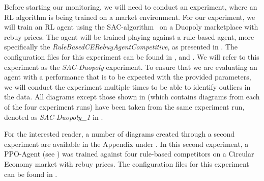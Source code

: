 Before starting our monitoring, we will need to conduct an experiment, where an RL algorithm is being trained on a market environment. For our experiment, we will train an RL agent using the SAC-algorithm~\cite{StableBaselines3SAC} on a Duopoly marketplace with rebuy prices. The agent will be trained playing against a rule-based agent, more specifically the \emph{RuleBasedCERebuyAgentCompetitive}, as presented in . The configuration files for this experiment can be found in ,  and . We will refer to this experiment as the \emph{SAC-Duopoly} experiment. To ensure that we are evaluating an agent with a performance that is to be expected with the provided parameters, we will conduct the experiment multiple times to be able to identify outliers in the data. All diagrams except those shown in  (which contains diagrams from each of the four experiment runs) have been taken from the same experiment run, denoted as \emph{SAC-Duopoly\_1} in .

For the interested reader, a number of diagrams created through a second experiment are available in the Appendix under . In this second experiment, a PPO-Agent (see ) was trained against four rule-based competitors on a Circular Economy market with rebuy prices. The configuration files for this experiment can be found in .



